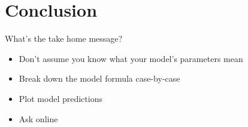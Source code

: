 \documentclass{beamer}
\begin{document}
\section{Conclusion}

\begin{frame}{What's the take home message?}

  \begin{itemize}
    \pause\item Don't assume you know what your model's parameters mean
    \pause\item Break down the model formula case-by-case
    \pause\item Plot model predictions
    \pause\item Ask online
  \end{itemize}
  \vspace{3em}
  \pause

\end{frame}
\end{document}
